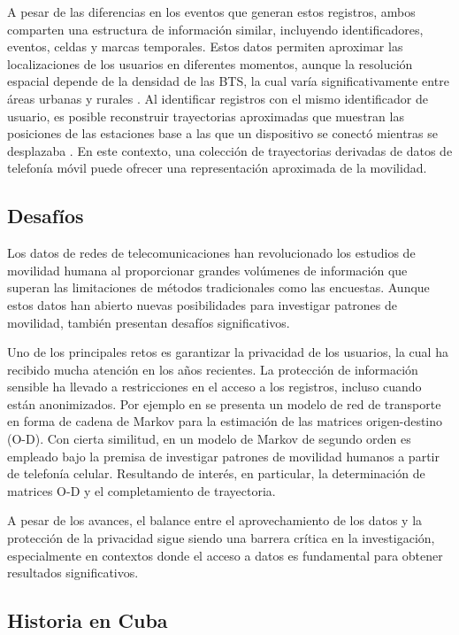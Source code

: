 A pesar de las diferencias en los eventos que generan estos registros, ambos comparten una estructura de información similar, incluyendo identificadores, eventos, celdas y marcas temporales. Estos datos permiten aproximar las localizaciones de los usuarios en diferentes momentos, aunque la resolución espacial depende de la densidad de las BTS, la cual varía significativamente entre áreas urbanas y rurales \cite{forghani2020cellular}. Al identificar registros con el mismo identificador de usuario, es posible reconstruir trayectorias aproximadas que muestran las posiciones de las estaciones base a las que un dispositivo se conectó mientras se desplazaba \cite{chen2018individual}. En este contexto, una colección de trayectorias derivadas de datos de telefonía móvil puede ofrecer una representación aproximada de la movilidad.

\subsection*{Desafíos}

Los datos de redes de telecomunicaciones han revolucionado los estudios de movilidad humana al proporcionar grandes volúmenes de información que superan las limitaciones de métodos tradicionales como las encuestas. Aunque estos datos han abierto nuevas posibilidades para investigar patrones de movilidad, también presentan desafíos significativos.

Uno de los principales retos es garantizar la privacidad de los usuarios, la cual ha recibido mucha atención en los años recientes. La protección de información sensible ha llevado a restricciones en el acceso a los registros, incluso cuando están anonimizados. Por ejemplo en \cite{tesselkin2017estimation} se presenta un modelo de red de transporte en forma de cadena de Markov para la estimación de las matrices origen-destino (O-D). Con cierta similitud, en \cite{pourmoradnasseri2019od} un modelo de Markov de segundo orden es empleado bajo la premisa de investigar patrones de movilidad humanos a partir de telefonía celular. Resultando de interés, en particular, la determinación de matrices O-D y el completamiento de trayectoria.

A pesar de los avances, el balance entre el aprovechamiento de los datos y la protección de la privacidad sigue siendo una barrera crítica en la investigación, especialmente en contextos donde el acceso a datos es fundamental para obtener resultados significativos.

\subsection*{Historia en Cuba}

